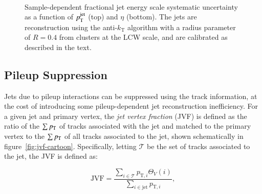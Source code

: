 \begin{figure}[htbp]
{	}
	 \\
	\caption{Sample-dependent fractional jet energy scale systematic uncertainty as a function of $p_{\text{T}}^{\mathrm{jet}}$ (top) and $\eta$ (bottom). The jets are reconstruction using the anti-$k_{\mathrm{T}}$ algorithm with a radius parameter of $R=0.4$ from clusters at the LCW scale, and are calibrated as described in the text.}
	\label{fig:reco-jes-uncertainty}
\end{figure}

\subsection{Pileup Suppression}
Jets due to pileup interactions can be suppressed using the track information, at the cost of introducing some pileup-dependent jet reconstruction inefficiency. For a given jet and primary vertex, the \emph{jet vertex fraction} (JVF) is defined as the ratio of the $\sum p_{\text{T}}$ of tracks associated with the jet and matched to the primary vertex to the $\sum p_{\text{T}}$ of all tracks associated to the jet, shown schematically in figure~\ref{fig:jvf-cartoon}. Specifically, letting $\mathcal{T}$ be the set of tracks associated to the jet, the JVF is defined as:

\begin{equation}\label{eqn:jvf}
	\mathrm{JVF}=\frac{\sum_{i\in\mathcal{T}} p_{\mathrm{T},i} \Theta_V(i)} {\sum_{i\in\mathrm{jet}} p_{\mathrm{T},i} },
\end{equation}

